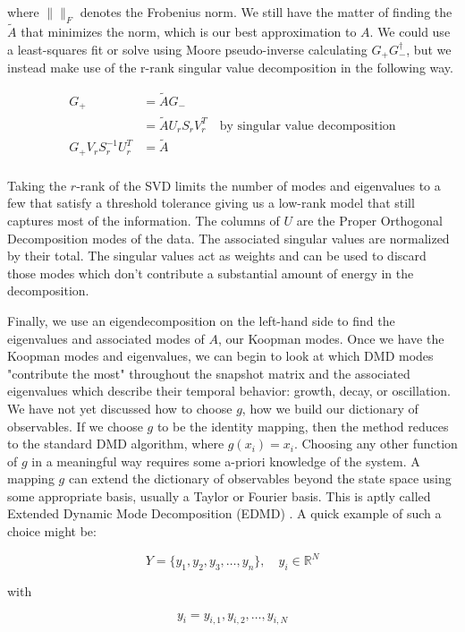 \noindent where $\| \|_{F}$ denotes the Frobenius norm. We still have the matter of finding the 
${\tilde A}$ that minimizes the norm, which is our best approximation to $A$. We could
use a least-squares fit or solve using Moore pseudo-inverse calculating $G_+G^{\dagger}_-$, but we instead
 make use of the r-rank singular value decomposition in the following way.

\begin{align*}
    G_+ &= {\tilde A}G_- \\
    &= {\tilde A}U_rS_rV^{T}_r \quad \text{by singular value decomposition} \\ 
G_+ V_r S^{-1}_r U^{T}_r &= {\tilde A} \\
\end{align*}

Taking the $r$-rank of the SVD limits the number of modes and
 eigenvalues to a few that satisfy a threshold tolerance giving us a low-rank model
 that still captures most of the information. 
The columns of $U$ are the Proper Orthogonal Decomposition modes of the
 data. The associated singular values are normalized by their total.
The singular values act as weights and can be used to discard those
 modes which don't contribute a substantial amount of energy in the decomposition.

Finally, we use an eigendecomposition on the left-hand side to find the 
eigenvalues and associated modes of $A$, our Koopman modes. Once we have the Koopman modes and eigenvalues, we can begin to look at which DMD modes
"contribute the most" throughout the snapshot matrix and the associated eigenvalues which describe
their temporal behavior: growth, decay, or oscillation. We have not yet
 discussed how to choose $g$, how we build our dictionary of observables. If we choose $g$ to 
be the identity mapping, then the method reduces to the standard DMD algorithm, where $g(x_i) = x_i$.
Choosing any other function of $g$ in a meaningful way requires some a-priori knowledge of the system.
A mapping $g$ can extend the dictionary of observables beyond the state space using some appropriate 
basis, usually a Taylor or Fourier basis. This is aptly called Extended Dynamic Mode Decomposition (EDMD) \cite{doi:10.1137/1.9781611974508}. A quick example of such
a choice might be:

$$
Y = \{y_1, y_2, y_3, \dots, y_n  \}, \quad y_i \in \mathbb{R}^{N}
$$

\noindent with 

$$
y_i = {y_{i,1}, y_{i,2},\dots, y_{i,N}} 
$$

